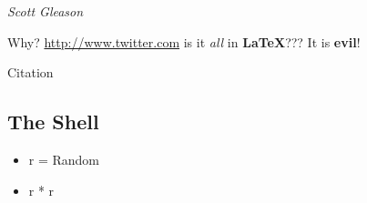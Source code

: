 \textit{Scott Gleason} 

Why? \href{Why}{http://www.twitter.com} is it \textit{all} in \textbf{LaTeX}??? It is \textbf{evil}!

Citation\cite{Ferry_2006}


\subsection{The Shell}
\begin{itemize}
\item r = Random
\item r * r
\end{itemize}